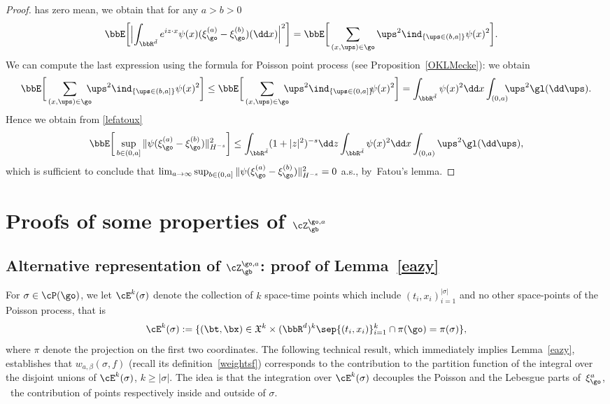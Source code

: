 \begin{proof}
has zero mean, we obtain that for any $a>b>0$
\begin{equation*}
\begin{split}
\bbE \biggl[\Bigl | \int_{\bbR^{\bar d}} e^{i z\cdot x} \psi(x)(\xi_{\go}^{(a)}-\xi_{\go}^{(b)})(\dd x) \Bigr|^2 \biggr]
& = \bbE \bigg[ \sum_{(x,\ups)\in \go} \ups^{2} \ind_{\{\ups\in (b,a]\}}\psi(x)^2 \bigg].
\end{split}
\end{equation*}
We can compute the last expression using the formula for Poisson point process (see Proposition~\ref{OKLMecke}): we obtain\vspace*{-5pt}
\[
\bbE \bigg[ \sum_{(x,\ups)\in \go}\hspace*{-2.5mm} \ups^{2} \ind_{\{\ups\in (b,a]\}}\psi(x)^2 \bigg] \le \bbE \bigg[ \sum_{(x,\ups)\in \go} \hspace*{-2.5mm}\ups^{2} \ind_{\{\ups\in (0,a]\}} \hspace*{-1mm}\psi(x)^2 \bigg]
= \int_{\bbR^{\bar d}} \psi(x)^2 \dd x \int_{(0,a)}\hspace*{-2mm} \ups^2 \gl(\dd \ups).
\]
Hence we obtain from \eqref{lefatoux}
\begin{equation*}
\bbE \bigg[ \sup_{b\in(0,a]}\|\psi(\xi_{\go}^{(a)}-\xi_{\go}^{(b)})\|^2_{H^{-s}}\bigg]\le \int_{\bbR^{\bar d}} (1+|z|^2)^{-s} \dd z \int_{\bbR^{\bar d}} \psi(x)^2 \dd x \int_{(0,a)} \ups^2 \gl(\dd \ups),
\end{equation*}
which is sufficient to conclude that $\lim_{a\to \infty} \sup_{b\in(0,a]}\|\psi(\xi_{\go}^{(a)}-\xi_{\go}^{(b)}) \|^2_{H^{-s}}=0$ a.s., by~Fatou's lemma.
\end{proof}

\section{Proofs of some properties of \texorpdfstring{$\cZ_{\gb}^{\go,a}$}{Z}}
\label{app:conti}

\subsection{Alternative representation of \texorpdfstring{$\cZ_{\gb}^{\go,a}$}{Z}: proof of Lemma~\ref{eazy}}
\label{app:eazy}

For $\sigma\in \cP(\go)$, we let $\cE^k(\sigma)$ denote the collection of $k$ space-time points which include $(t_i,x_i)_{i=1}^{|\sigma|}$ and no other space-points of the Poisson process, that is
\begin{equation}
\cE^k(\sigma):= \{ (\bt,\bx)\in \mathfrak{X}^k\times (\bbR^d)^k \sep \{(t_i,x_i)\}_{i=1}^k\cap \pi(\go)= \pi(\sigma) \},
\end{equation}
where $\pi$ denote the projection on the first two coordinates.
The following technical result, which immediately implies Lemma~\ref{eazy}, establishes that $w_{a,\beta}(\sigma,f)$ (recall its definition~\eqref{weightsf}) corresponds to the contribution to the partition function of the integral over the disjoint unions of $ \cE^k(\sigma)$, $k\ge |\sigma|$.
The idea is that the integration over $\cE^k(\sigma)$ decouples the Poisson and the Lebesgue parts of~$\xi_{\go}^{a}$,
\ie \ the contribution of points respectively inside and outside of $\sigma$.

